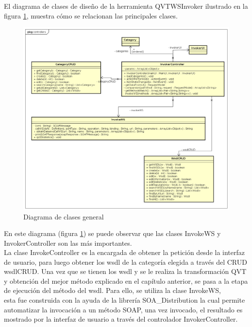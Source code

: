  El diagrama de clases de diseño de la herramienta QVTWSInvoker ilustrado en la figura \ref{fig:Diagrama de clases general}, muestra cómo se relacionan las principales clases.\\

  \begin{figure}[H] 
  	\begin{center}
  		\includegraphics [scale=0.45]{imagenes/diagrama_clases_general.png}
  	\end{center}
  	\caption{Diagrama de clases general}
  	\label{fig:Diagrama de clases general}
  \end{figure}


   En este diagrama (figura \ref{fig:Diagrama de clases general}) se puede observar que las clases InvokeWS y InvokerController son las más importantes. \\
  La clase InvokeController es la encargada de obtener la petición desde la interfaz de usuario, para luego obtener los wsdl de la categoría elegida a través del CRUD wsdlCRUD. Una vez que se tienen los wsdl y se le realiza la transformación QVT y obtención del mejor método explicado en el capítulo anterior, se pasa a la etapa de ejecución del método del wsdl. Para ello, se utiliza la clase InvokeWS,\\
  esta fue construida con la ayuda de la librería SOA\_Distribution la cual permite automatizar la invocación a un método SOAP, una vez invocado, el resultado es mostrado por la interfaz de usuario a través del controlador InvokerController.
  
